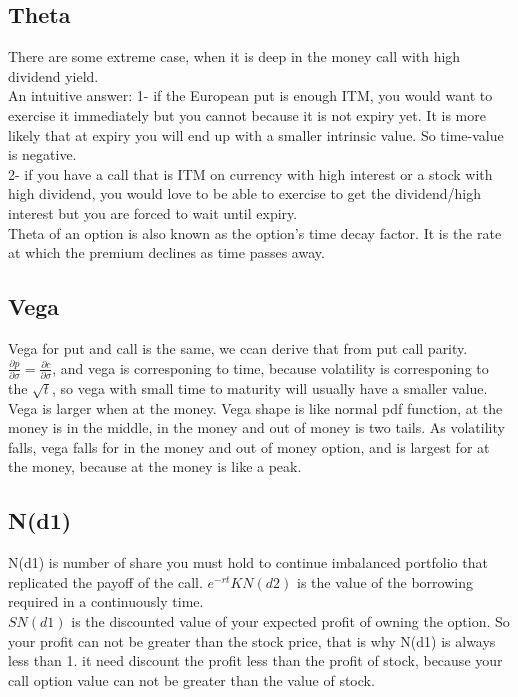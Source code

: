 \documentclass[a4paper,11pt]{article}
\begin{document}
\subsection{Theta}
There are some extreme case, when it is deep in the money call with high dividend yield.\\
An intuitive answer:
1- if the European put is enough ITM, you would want to exercise it immediately but you cannot because it is not expiry yet. It is more likely that at expiry you will end up with a smaller intrinsic value. So time-value is negative.\\
2- if you have a call that is ITM on currency with high interest or a stock with high dividend, you would love to be able to exercise to get the dividend/high interest but you are forced to wait until expiry.\\
 Theta of an option is also known as the option's time decay factor. It is the rate at which the premium declines as time passes away.\\
\subsection{Vega}
Vega for put and call is the same, we ccan derive that from put call parity. $\frac{\partial p}{\partial \sigma}=\frac{\partial c}{\partial \sigma}$, and vega is corresponing to time, because volatility is corresponing to the $\sqrt{t}$, so vega with small time to maturity will usually have a smaller value. Vega is larger when at the money. Vega shape is like normal pdf function, at the money is in the middle, in the money and out of money is two tails. As volatility falls, vega falls for in the money and out of money option, and is largest for at the money, because at the money is like a peak.\\



\subsection{N(d1)}
N(d1) is number of share you must hold to continue imbalanced portfolio that replicated the payoff of the call.
$e^{-rt}KN(d2)$ is the value of the borrowing required in a continuously time.\\
 $SN(d1)$ is the discounted value of your expected profit of owning the option. So your profit can not be greater than the stock price, that is why N(d1) is always less than 1. it need discount the profit less than the profit of stock, because your call option value can not be greater than the value of stock.
\end{document}

